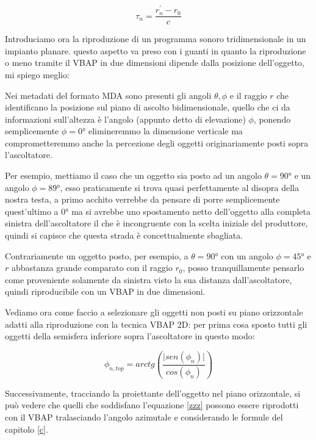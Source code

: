 \documentclass[12pt,a4paper]{report}
\begin{document}
\begin{equation}
\tau_{n} = \dfrac{r_n^{\prime}-r_0}{c}
\label{eq:tau}
\end{equation}



Introduciamo ora la riproduzione di un programma sonoro tridimensionale in un impianto planare.  questo aspetto va preso con i guanti in quanto la riproduzione o meno tramite il VBAP in due dimensioni dipende dalla posizione dell'oggetto, mi spiego meglio:

Nei metadati del formato MDA sono presenti gli angoli $\theta, \phi$ e il raggio $r$ che identificano la posizione sul piano di ascolto bidimensionale, quello che ci da informazioni sull'altezza è l'angolo (appunto detto di elevazione) $\phi$, ponendo semplicemente $\phi=0°$ elimineremmo la dimensione verticale ma comprometteremmo anche la percezione degli oggetti originariamente posti sopra l'ascoltatore.

Per esempio, mettiamo il caso che un oggetto sia posto ad un angolo $	\theta= 90° $ e un angolo $\phi=89°$, esso praticamente si trova quasi perfettamente al disopra della nostra testa, a primo acchito verrebbe da pensare di porre semplicemente quest'ultimo a $0°$ ma si avrebbe uno spostamento netto dell'oggetto alla completa sinistra dell'ascoltatore il che è incongruente con la scelta iniziale del produttore, quindi si capisce che questa strada è concettualmente sbagliata.

Contrariamente un oggetto posto, per esempio, a $\theta= 90°$ con un angolo $\phi=45°$ e $r$ abbastanza grande comparato con il raggio $r_0$, posso tranquillamente pensarlo come proveniente solamente da sinistra visto la sua distanza dall'ascoltatore, quindi riproducibile con un VBAP in due dimensioni.

Vediamo ora come faccio a selezionare gli oggetti non posti su piano orizzontale adatti alla riproduzione con la tecnica VBAP 2D: per prima cosa sposto tutti gli oggetti della semisfera inferiore sopra l'ascoltatore in questo modo:

\begin{equation}
\phi_{n,top} = arctg  \left( \dfrac{\vert sen(\phi_n) \vert}{ cos(\phi_n) } \right)
\label{  b}
\end{equation}

Successivamente, tracciando la proiettante dell'oggetto nel piano orizzontale, si può vedere che quelli che soddisfano l'equazione \ref{zzz} possono essere riprodotti con il VBAP tralasciando l'angolo azimutale e considerando le formule del capitolo \ref{c}.
\end{document}
